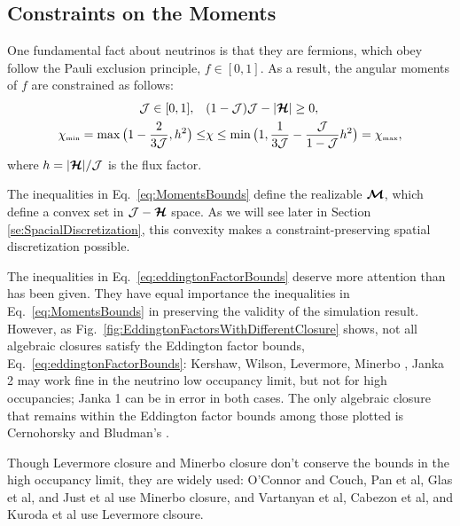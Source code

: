\subsection{Constraints on the Moments}
One fundamental fact about neutrinos is that they are fermions, which obey follow the Pauli exclusion principle, $f \in [0,1]$.
As a result, the angular moments of $f$ are constrained as follows: 
\begin{align}
\mathcal{J} \in[0,1], \quad &(1-\mathcal{J})\mathcal{J}-|\boldsymbol{\mathcal{H}}|  \geq 0, \label{eq:MomentsBounds}\\
  \chi_{\mbox{\tiny min}}
  =\max\big(1-\frac{2}{3\mathcal{J}},h^{2}\big)
  \leq & \chi \leq \min\big(1,\frac{1}{3\mathcal{J}}-\frac{\mathcal{J}}{1-\mathcal{J}}h^{2}\big)=\chi_{\mbox{\tiny max}},
  \label{eq:eddingtonFactorBounds}
\end{align}
where $h = |\boldsymbol{\mathcal{H}}|/\mathcal{J}$ is the flux factor.\cite{levermore_1984,lareckiBanach_2011,kershaw_1976,shohatTamarkin_1943}

The inequalities in Eq.~\eqref{eq:MomentsBounds} define the realizable $\boldsymbol{\mathcal{M}}$, which define a convex set in $\mathcal{J} -\boldsymbol{\mathcal{H}}$ space.
As we will see later in Section \ref{se:SpacialDiscretization}, this convexity makes a constraint-preserving spatial discretization possible.

The inequalities in Eq.~\eqref{eq:eddingtonFactorBounds} deserve more attention than has been given.
They have equal importance  the inequalities in Eq.~\eqref{eq:MomentsBounds} in preserving the validity of the simulation result.
However, as Fig.~\eqref{fig:EddingtonFactorsWithDifferentClosure} shows, not all algebraic closures satisfy the Eddington factor bounds, Eq.~\eqref{eq:eddingtonFactorBounds}: Kershaw\cite{kershaw_1976}, Wilson\cite{wilson_1975,leblancWilson_1970}, Levermore\cite{levermore_1984}, Minerbo \cite{minerbo_1978}, Janka 2\cite{janka_1992} may work fine in the neutrino low occupancy limit, but not for high occupancies; Janka 1\cite{janka_1991} can be in error in both cases.
The only algebraic closure that remains within the Eddington factor bounds among those plotted is Cernohorsky and Bludman's \cite{cernohorskyBludman_1994}.

Though Levermore closure and Minerbo closure don't conserve the bounds in the high occupancy limit, they are widely used: {O'Connor} and {Couch}\cite{oConnorCouch_2018}, Pan et al\cite{pan_etal_2018}, Glas et al\cite{glas_etal_2018}, and Just et al\cite{just_etal_2018} use Minerbo closure, and Vartanyan et al\cite{vartanyan_etal_2018}, Cabezon et al\cite{cabezon_etal_2018}, and Kuroda et al\cite{kuroda_etal_2016} use Levermore clsoure.

